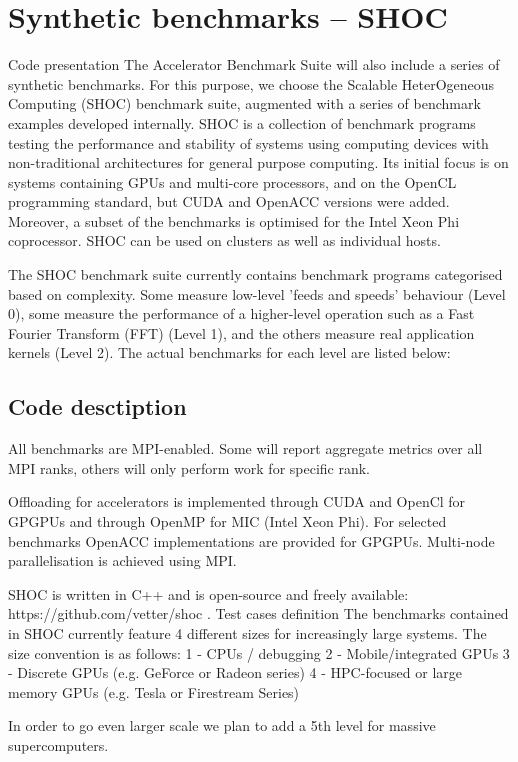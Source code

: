 \section{Synthetic benchmarks -- SHOC}
Code presentation
The Accelerator Benchmark Suite will also include a series of synthetic benchmarks. For this purpose, we choose the Scalable HeterOgeneous Computing (SHOC) benchmark suite, augmented with a series of benchmark examples developed internally. SHOC is a collection of benchmark programs testing the performance and stability of systems using computing devices with non-traditional architectures for general purpose computing. Its initial focus is on systems containing GPUs and multi-core processors, and on the OpenCL programming standard, but CUDA and OpenACC versions were added. Moreover, a subset of the benchmarks is optimised for the Intel Xeon Phi coprocessor. SHOC can be used on clusters as well as individual hosts.

The SHOC benchmark suite currently contains benchmark programs categorised based on complexity.  Some measure low-level 'feeds and speeds' behaviour (Level 0), some measure the performance of a higher-level operation such as a Fast Fourier Transform (FFT) (Level 1), and the others measure real application kernels (Level 2). The actual benchmarks for each level are listed below:

\subsection{Code desctiption}

All benchmarks are MPI-enabled. Some will report aggregate metrics over all MPI ranks, others will only perform work for specific rank.

Offloading for accelerators is implemented through CUDA and OpenCl for GPGPUs and through OpenMP for MIC (Intel Xeon Phi). For selected benchmarks OpenACC implementations are provided for GPGPUs. Multi-node parallelisation is achieved using MPI.

SHOC is written in C++ and is open-source and freely available: https://github.com/vetter/shoc .
Test cases definition
The benchmarks contained in SHOC currently feature 4 different sizes for increasingly large systems. The size convention is as follows:
1 - CPUs / debugging
2 - Mobile/integrated GPUs
3 - Discrete GPUs (e.g. GeForce or Radeon series)
4 - HPC-focused or large memory GPUs (e.g. Tesla or Firestream Series)

In order to go even larger scale we plan to add a 5th level for massive supercomputers.

